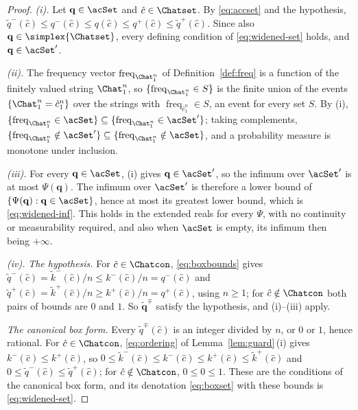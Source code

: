 \begin{proof}
\emph{(i).} Let $\mathbf{q}\in\acSet$ and $\hat c\in\Chatset$. By
\eqref{eq:accset} and the hypothesis,
$\tilde q^{-}(\hat c)\le q^{-}(\hat c)\le q(\hat c)\le q^{+}(\hat c)\le
\tilde q^{+}(\hat c)$. Since also $\mathbf{q}\in\simplex{\Chatset}$, every
defining condition of \eqref{eq:widened-set} holds, and
$\mathbf{q}\in\acSet'$.

\emph{(ii).} The frequency vector $\operatorname{freq}_{\Chat_1^n}$ of
Definition~\ref{def:freq} is a function of the finitely valued string
$\Chat_1^n$, so $\{\operatorname{freq}_{\Chat_1^n}\in S\}$ is the finite
union of the events $\{\Chat_1^n=\hat c_1^n\}$ over the strings with
$\operatorname{freq}_{\hat c_1^n}\in S$, an event for every set $S$. By (i),
$\{\operatorname{freq}_{\Chat_1^n}\in\acSet\}\subseteq
\{\operatorname{freq}_{\Chat_1^n}\in\acSet'\}$; taking complements,
$\{\operatorname{freq}_{\Chat_1^n}\notin\acSet'\}\subseteq
\{\operatorname{freq}_{\Chat_1^n}\notin\acSet\}$, and a probability measure
is monotone under inclusion.

\emph{(iii).} For every $\mathbf{q}\in\acSet$, (i) gives
$\mathbf{q}\in\acSet'$, so the infimum over $\acSet'$ is at most
$\Psi(\mathbf{q})$. The infimum over $\acSet'$ is therefore a lower bound of
$\{\Psi(\mathbf{q}):\mathbf{q}\in\acSet\}$, hence at most its greatest lower
bound, which is \eqref{eq:widened-inf}. This holds in the extended reals for
every $\Psi$, with no continuity or measurability required, and also when
$\acSet$ is empty, its infimum then being $+\infty$.

\emph{(iv).} \emph{The hypothesis.} For $\hat c\in\Chatcon$,
\eqref{eq:boxbounds} gives
$\tilde q^{-}(\hat c)=\tilde k^{-}(\hat c)/n\le k^{-}(\hat c)/n=q^{-}(\hat c)$
and $\tilde q^{+}(\hat c)=\tilde k^{+}(\hat c)/n\ge k^{+}(\hat c)/n
=q^{+}(\hat c)$, using $n\ge1$; for $\hat c\notin\Chatcon$ both pairs of
bounds are $0$ and $1$. So $\tilde{\mathbf{q}}^{\mp}$ satisfy the hypothesis,
and (i)--(iii) apply.

\emph{The canonical box form.} Every $\tilde q^{\mp}(\hat c)$ is an integer
divided by $n$, or $0$ or $1$, hence rational. For $\hat c\in\Chatcon$,
\eqref{eq:ordering} of Lemma~\ref{lem:guard}\,(i) gives
$k^{-}(\hat c)\le k^{+}(\hat c)$, so
$0\le\tilde k^{-}(\hat c)\le k^{-}(\hat c)\le k^{+}(\hat c)\le
\tilde k^{+}(\hat c)$ and $0\le\tilde q^{-}(\hat c)\le\tilde q^{+}(\hat c)$;
for $\hat c\notin\Chatcon$, $0\le0\le1$. These are the conditions of the
canonical box form, and its denotation \eqref{eq:boxset} with these bounds is
\eqref{eq:widened-set}.


\end{proof}
